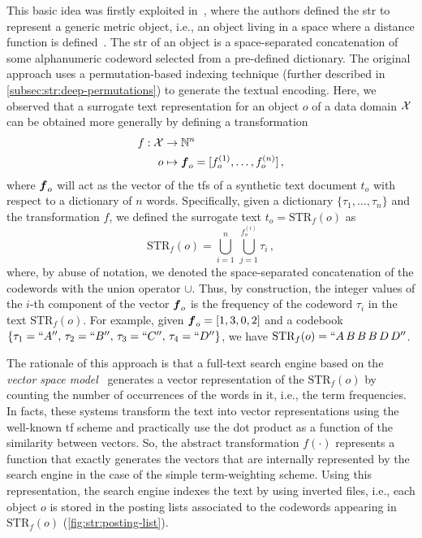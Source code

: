 This basic idea was firstly exploited in~\cite{gennaro2010approach}, where the authors defined the \acrfull{str} to represent a generic metric object, i.e., an object living in a space where a distance function is defined~\cite{zezula2006similarity}.
The \gls{str} of an object is a space-separated concatenation of some alphanumeric codeword selected from a pre-defined dictionary.
The original approach uses a permutation-based indexing technique (further described in \ref{subsec:str:deep-permutations}) to generate the textual encoding.
Here, we observed that a surrogate text representation for an object $o$ of a data domain $\mathcal{X}$ can be obtained more generally by defining a transformation
\begin{align}
	f : \mathcal{X} &\to \mathbb{N}^n\\
	o &\mapsto \boldsymbol {f}_o=[f_o^{(1)}, \dots, f_o^{(n)}] \,,
\end{align}
where $\boldsymbol {f}_o$ will act as the vector of the \glspl{tf} of a synthetic text document $t_o$ with respect to a dictionary of $n$ words.
Specifically, given a dictionary $\{\tau_1, \dots, \tau_n\}$ and the transformation $f$, we defined the surrogate text $ t_o=\text{STR}_f(o)$ as
\begin{equation}
	\text{STR}_f(o)=\bigcup_{i=1}^n\,\bigcup_{j=1}^{f_o^{(i)}} \tau_i \,,
\end{equation}
where, by abuse of notation, we denoted the space-separated concatenation of the codewords with the union operator $\cup$.
Thus, by construction, the integer values of the $i$-th component of the vector $\boldsymbol {f}_o$ is the frequency of the codeword $\tau_i$ in the text $\text{STR}_f(o)$.
For example, given $\boldsymbol {f}_o=[1,3,0,2]$ and a codebook $\{\tau_1=``A'',\,  \tau_2=``B'',\, \tau_3=``C'', \,\tau_4=``D''\}$, we have $\text{STR}_f(o)=``A \, B \, B \, B \, D \, D''$.

The rationale of this approach is that a full-text search engine based on the \emph{vector space model}~\cite{salton1986introduction} generates a vector representation of the $\text{STR}_f(o)$ by counting the number of occurrences of the words in it, i.e., the term frequencies.
In facts, these systems transform the text into vector representations using the well-known \gls{tf} scheme and practically use the dot product as a function of the similarity between vectors.
So, the abstract transformation $f(\cdot)$ represents a function that exactly generates the vectors that are internally represented by the search engine in the case of the simple term-weighting scheme.
Using this representation, the search engine indexes the text by using inverted files, i.e., each object $o$ is stored in the posting lists associated to the codewords appearing in $\text{STR}_f(o)$ (\ref{fig:str:posting-list}).

